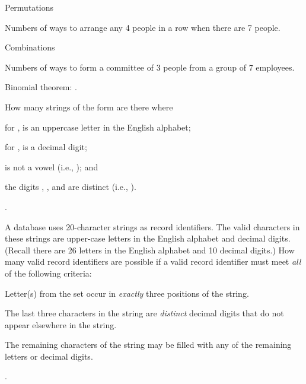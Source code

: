 			\item  Permutations

				Numbers of ways to arrange any 4 people in a row when there are 7 people.

			\item  Combinations

				Numbers of ways to form a committee of 3 people from a group of 7 employees.

			\item  Binomial theorem: .

		\stopitemize

		\page

		\startexercise [title={AC Ex 2.7}]
			How many strings of the form  are there where
			\startitemize [m, joinedup]
				\item  for ,  is an uppercase letter in the English alphabet;
				\item  for ,  is a decimal digit;
				\item  {} is not a vowel (i.e., ); and
				\item  the digits , , and  are distinct (i.e., ).
			\stopitemize
		\stopexercise

		\startsolution
			.
		\stopsolution


		\startexercise [title={AC Ex 2.9}]
			A database uses 20-character strings as record identifiers. The valid characters in these strings are upper-case letters in the English alphabet and decimal digits. (Recall there are 26 letters in the English alphabet and 10 decimal digits.) How many valid record identifiers are possible if a valid record identifier must meet \emph{all} of the following criteria:
			\startitemize [m, joinedup]
				\item  Letter(s) from the set \m{\bcrl[A, E, I, O, U]} occur in \emph{exactly} three positions of the string.
				\item  The last three characters in the string are \emph{distinct} decimal digits that do not appear elsewhere in the string.
				\item  The remaining characters of the string may be filled with any of the remaining letters or decimal digits.
			\stopitemize
		\stopexercise

		\startsolution
			.
		\stopsolution
	
